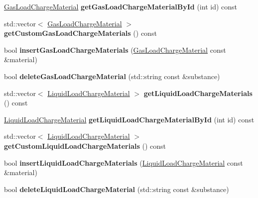 \begin{DoxyCompactItemize}
\hyperlink{class_gas_load_charge_material}{Gas\+Load\+Charge\+Material} {\bfseries get\+Gas\+Load\+Charge\+Material\+By\+Id} (int id) const
\item 
\mbox{\label{class_s_q_lite_a1957d2f9ac35433b45e8511aa6889756}} 
std\+::vector$<$ \hyperlink{class_gas_load_charge_material}{Gas\+Load\+Charge\+Material} $>$ {\bfseries get\+Custom\+Gas\+Load\+Charge\+Materials} () const
\item 
\mbox{\label{class_s_q_lite_af482f51c0d3de08fbfa3e537382a567f}} 
bool {\bfseries insert\+Gas\+Load\+Charge\+Materials} (\hyperlink{class_gas_load_charge_material}{Gas\+Load\+Charge\+Material} const \&material)
\item 
\mbox{\label{class_s_q_lite_ac354a72accd5a0d8901da9df19c045d3}} 
bool {\bfseries delete\+Gas\+Load\+Charge\+Material} (std\+::string const \&substance)
\item 
\mbox{\label{class_s_q_lite_a349f65213cc1b022293bc00ba0a4c3b5}} 
std\+::vector$<$ \hyperlink{class_liquid_load_charge_material}{Liquid\+Load\+Charge\+Material} $>$ {\bfseries get\+Liquid\+Load\+Charge\+Materials} () const
\item 
\mbox{\label{class_s_q_lite_a3f31756b0fc49be7123e7146cbb12c70}} 
\hyperlink{class_liquid_load_charge_material}{Liquid\+Load\+Charge\+Material} {\bfseries get\+Liquid\+Load\+Charge\+Material\+By\+Id} (int id) const
\item 
\mbox{\label{class_s_q_lite_a1a252d50bc2e861325f120a814fddd37}} 
std\+::vector$<$ \hyperlink{class_liquid_load_charge_material}{Liquid\+Load\+Charge\+Material} $>$ {\bfseries get\+Custom\+Liquid\+Load\+Charge\+Materials} () const
\item 
\mbox{\label{class_s_q_lite_aff9ccdb8af003d3a0a3fdc9a85af77d8}} 
bool {\bfseries insert\+Liquid\+Load\+Charge\+Materials} (\hyperlink{class_liquid_load_charge_material}{Liquid\+Load\+Charge\+Material} const \&material)
\item 
\mbox{\label{class_s_q_lite_a4dbd677be8b79a0f85018fa1bed3c1db}} 
bool {\bfseries delete\+Liquid\+Load\+Charge\+Material} (std\+::string const \&substance)

\end{DoxyCompactItemize}
